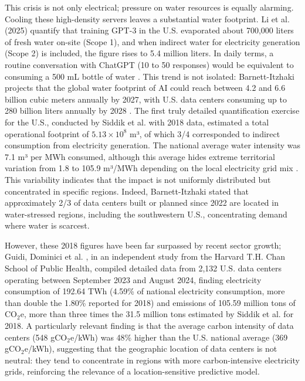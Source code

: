 \documentclass[conference]{IEEEtran}
\begin{document}
This crisis is not only electrical; pressure on water resources is equally alarming. Cooling these high-density servers leaves a substantial water footprint. Li et al. (2025) quantify that training GPT-3 in the U.S. evaporated about 700,000 liters of fresh water on-site (Scope 1), and when indirect water for electricity generation (Scope 2) is included, the figure rises to 5.4 million liters. In daily terms, a routine conversation with ChatGPT (10 to 50 responses) would be equivalent to consuming a 500 mL bottle of water \cite{Yoo2026}. This trend is not isolated: Barnett-Itzhaki \cite{Barnett2026} projects that the global water footprint of AI could reach between 4.2 and 6.6 billion cubic meters annually by 2027, with U.S. data centers consuming up to 280 billion liters annually by 2028 \cite{Barnett2026}. The first truly detailed quantification exercise for the U.S., conducted by Siddik et al. \cite{Siddik2021} with 2018 data, estimated a total operational footprint of $5.13 \times 10^8$ m³, of which 3/4 corresponded to indirect consumption from electricity generation. The national average water intensity was 7.1 m³ per MWh consumed, although this average hides extreme territorial variation from 1.8 to 105.9 m³/MWh depending on the local electricity grid mix \cite{Siddik2021}. This variability indicates that the impact is not uniformly distributed but concentrated in specific regions. Indeed, Barnett-Itzhaki \cite{Barnett2026} stated that approximately 2/3 of data centers built or planned since 2022 are located in water-stressed regions, including the southwestern U.S., concentrating demand where water is scarcest.

However, these 2018 figures have been far surpassed by recent sector growth; Guidi, Dominici et al. \cite{Guidi2024}, in an independent study from the Harvard T.H. Chan School of Public Health, compiled detailed data from 2,132 U.S. data centers operating between September 2023 and August 2024, finding electricity consumption of 192.64 TWh (4.59\% of national electricity consumption, more than double the 1.80\% reported for 2018) and emissions of 105.59 million tons of CO$_2$e, more than three times the 31.5 million tons estimated by Siddik et al. for 2018. A particularly relevant finding is that the average carbon intensity of data centers (548 gCO$_2$e/kWh) was 48\% higher than the U.S. national average (369 gCO$_2$e/kWh), suggesting that the geographic location of data centers is not neutral: they tend to concentrate in regions with more carbon-intensive electricity grids, reinforcing the relevance of a location-sensitive predictive model.
\end{document}
